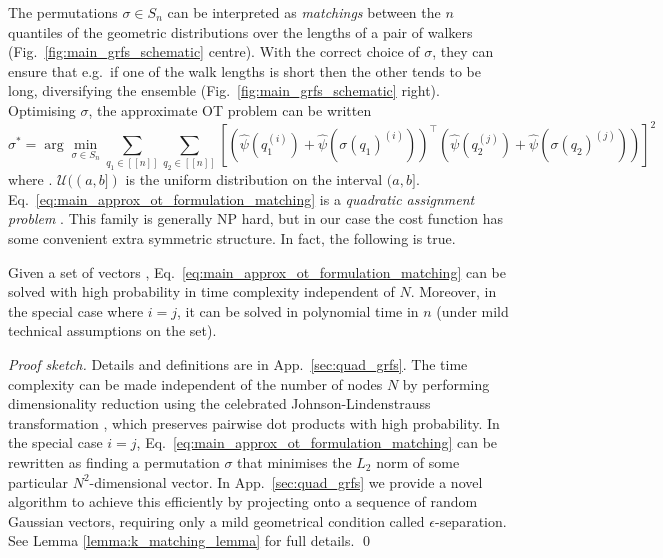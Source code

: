 The permutations $\sigma \in S_n$ can be interpreted as \emph{matchings} between the $n$ quantiles of the geometric distributions over the lengths of a pair of walkers (Fig.~\ref{fig:main_grfs_schematic} centre).
With the correct choice of $\sigma$, they can ensure that e.g.~if one of the walk lengths is short then the other tends to be long, diversifying the ensemble (Fig.~\ref{fig:main_grfs_schematic} right).
Optimising $\sigma$, the approximate OT problem can be written
\small
\begin{equation} \label{eq:main_approx_ot_formulation_matching}
    \sigma^* = \arg \min_{\sigma \in S_n}  \sum_{q_1 \in [\![n]\!]} \sum_{q_2 \in [\![n]\!]} \left [ \left( \widehat{\psi}( q_{1}^{(i)}) + \widehat{\psi}( \sigma(q_1)^{(i)}) \right)^\top \left( \widehat{\psi}( q_{2}^{(j)}) + \widehat{\psi}( \sigma(q_2)^{(j)}) \right) \right]^2 
\end{equation}
\normalsize
where\vspace{1mm} \smash{$\widehat{\psi}(q^{(i)}) \coloneqq \mathbb{E}_{u \sim \mathcal{U}((\frac{q-1}{n}, \frac{q}{n}])} \left( \mathbb{E}_\textrm{dirs}{\psi}( F^{-1}_{\eta_\textrm{G}} (u)^{(i)})\right)$}.
$\mathcal{U}((a,b])$ is the uniform distribution on the interval $(a,b]$. %
Eq.~\ref{eq:main_approx_ot_formulation_matching} is a \emph{quadratic assignment problem} \citep{finke1987quadratic, burkard1998quadratic}.
This family is generally NP hard, but in our case the cost function has some convenient extra symmetric structure. 
In fact, the following is true. 
\begin{theorem} \label{thm:exact_soln}
Given a set of vectors ,  
Eq.~\ref{eq:main_approx_ot_formulation_matching} can be solved with high probability in time complexity independent of $N$. Moreover, in the special case where $i=j$, it can be solved in polynomial time in $n$ (under mild technical assumptions on the set). %
\end{theorem}
\emph{Proof sketch.} Details and definitions are in App.~\ref{sec:quad_grfs}. 
The time complexity can be made independent of the number of nodes $N$ by performing dimensionality reduction using the celebrated Johnson-Lindenstrauss transformation \citep{dasgupta_jlt}, which preserves pairwise dot products with high probability. 
In the special case $i=j$, Eq.~\ref{eq:main_approx_ot_formulation_matching} can be rewritten as finding a permutation $\sigma$ that minimises the $L_2$ norm of some particular $N^2$-dimensional vector.
In App.~\ref{sec:quad_grfs} we provide a novel algorithm to achieve this efficiently by projecting onto a sequence of random Gaussian vectors, requiring only a mild geometrical condition called $\epsilon$-separation. See Lemma \ref{lemma:k_matching_lemma} for full details. \qed  

